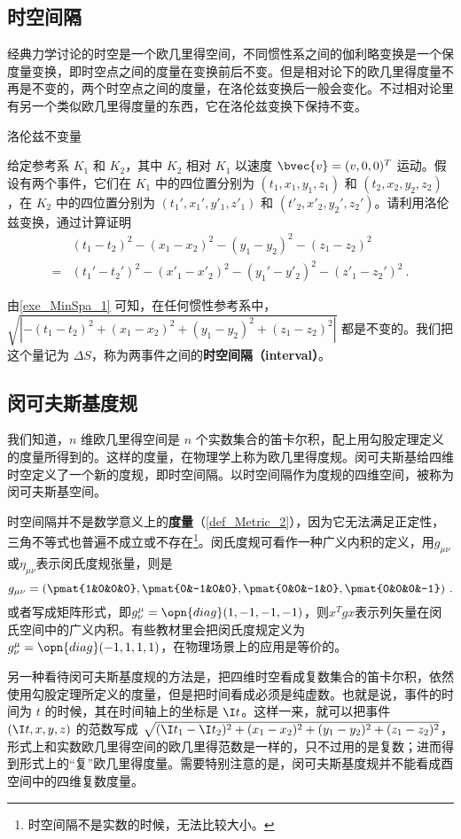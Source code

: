 

\subsection{时空间隔}
经典力学讨论的时空是一个欧几里得空间，不同惯性系之间的伽利略变换是一个保度量变换，即时空点之间的度量在变换前后不变。但是相对论下的欧几里得度量不再是不变的，两个时空点之间的度量，在洛伦兹变换后一般会变化。不过相对论里有另一个类似欧几里得度量的东西，它在洛伦兹变换下保持不变。

\begin{exercise}{洛伦兹不变量}\label{exe_MinSpa_1}

给定参考系 $K_1$ 和 $K_2$，其中 $K_2$ 相对 $K_1$ 以速度 $\bvec{v}=(v,0,0)^T$ 运动。假设有两个事件，它们在 $K_1$ 中的四位置分别为 $(t_1, x_1, y_1, z_1)$ 和 $(t_2, x_2, y_2, z_2)$，在 $K_2$ 中的四位置分别为 $(t_1', x_1', y'_1, z'_1)$ 和 $(t'_2, x'_2, y_2', z_2')$。请利用洛伦兹变换，通过计算证明
\begin{equation}
\begin{aligned}
&(t_1-t_2)^2-(x_1-x_2)^2-(y_1-y_2)^2-(z_1-z_2)^2\\=&(t_1'-t_2')^2-(x'_1-x'_2)^2-(y_1'-y'_2)^2-(z'_1-z_2')^2~.
\end{aligned}
\end{equation}
\end{exercise}

由\autoref{exe_MinSpa_1} 可知，在任何惯性参考系中，$\sqrt{|-(t_1-t_2)^2+(x_1-x_2)^2+(y_1-y_2)^2+(z_1-z_2)^2|}$ 都是不变的。我们把这个量记为 $\Delta S$，称为两事件之间的\textbf{时空间隔（interval）}。

\subsection{闵可夫斯基度规}

我们知道，$n$ 维欧几里得空间是 $n$ 个实数集合的笛卡尔积，配上用勾股定理定义的度量所得到的。这样的度量，在物理学上称为欧几里得度规。闵可夫斯基给四维时空定义了一个新的度规，即时空间隔。以时空间隔作为度规的四维空间，被称为闵可夫斯基空间。

时空间隔并不是数学意义上的\textbf{度量}（\autoref{def_Metric_2}），因为它无法满足正定性，三角不等式也普遍不成立或不存在\footnote{时空间隔不是实数的时候，无法比较大小。}。闵氏度规可看作一种广义内积的定义，用$g_{\mu\nu}$或$\eta_{\mu\nu}$表示闵氏度规张量，则是
\begin{equation}
g_{\mu \nu}=(\pmat{1&0&0&0},\pmat{0&-1&0&0},\pmat{0&0&-1&0},\pmat{0&0&0&-1})~.
\end{equation}
或者写成矩阵形式，即$g^{\mu}_{\nu}=\opn{diag}(1,-1,-1,-1)$，则$x^Tgx$表示列矢量在闵氏空间中的广义内积。有些教材里会把闵氏度规定义为$g^{\mu}_{\nu}=\opn{diag}(-1,1,1,1)$，在物理场景上的应用是等价的。


另一种看待闵可夫斯基度规的方法是，把四维时空看成复数集合的笛卡尔积，依然使用勾股定理所定义的度量，但是把时间看成必须是纯虚数。也就是说，事件的时间为 $t$ 的时候，其在时间轴上的坐标是 $\I t$。这样一来，就可以把事件 $(\I t, x, y, z)$ 的范数写成 $\sqrt{(\I t_1-\I t_2)^2+(x_1-x_2)^2+(y_1-y_2)^2+(z_1-z_2)^2}$，形式上和实数欧几里得空间的欧几里得范数是一样的，只不过用的是复数；进而得到形式上的“复”欧几里得度量。需要特别注意的是，闵可夫斯基度规并不能看成酉空间中的四维复数度量。

